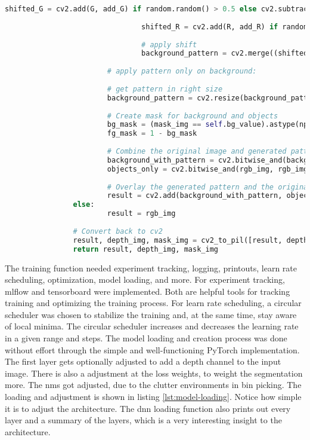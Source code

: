 \begin{lstlisting}[language=Python,caption=Random Augmentation of the Background using cv2 in Python, label=lst:bg-augmentation]
								shifted_G = cv2.add(G, add_G) if random.random() > 0.5 else cv2.subtract(G, add_G)
								
								shifted_R = cv2.add(R, add_R) if random.random() > 0.5 else cv2.subtract(R, add_R)
								
								# apply shift
								background_pattern = cv2.merge((shifted_B, shifted_G, shifted_R))
								
						# apply pattern only on background:
						
						# get pattern in right size
						background_pattern = cv2.resize(background_pattern, (rgb_img.shape[1], rgb_img.shape[0]))
						
						# Create mask for background and objects
						bg_mask = (mask_img == self.bg_value).astype(np.uint8)
						fg_mask = 1 - bg_mask
						
						# Combine the original image and generated pattern
						background_with_pattern = cv2.bitwise_and(background_pattern, background_pattern, mask=bg_mask)
						objects_only = cv2.bitwise_and(rgb_img, rgb_img, mask=fg_mask)
						
						# Overlay the generated pattern and the original objects
						result = cv2.add(background_with_pattern, objects_only)
				else:
						result = rgb_img
				
				# Convert back to cv2
				result, depth_img, mask_img = cv2_to_pil([result, depth_img, mask_img])
				return result, depth_img, mask_img
		\end{lstlisting}
		
		The training function needed experiment tracking, logging, printouts, learn rate scheduling, optimization, model loading, and more. For experiment tracking, mlflow and tensorboard were implemented. Both are helpful tools for tracking training and optimizing the training process. For learn rate scheduling, a circular scheduler was chosen to stabilize the training and, at the same time, stay aware of local minima. The circular scheduler increases and decreases the learning rate in a given range and steps. The model loading and creation process was done without effort through the simple and well-functioning PyTorch implementation. The first layer gets optionally adjusted to add a depth channel to the input image. There is also a adjustment at the loss weights, to weight  the segmentation more. The \acl{nms} got adjusted, due to the clutter environments in bin picking. The loading and adjustment is shown in listing \ref{lst:model-loading}. Notice how simple it is to adjust the architecture. The \ac{dnn} loading function also prints out every layer and a summary of the layers, which is a very interesting insight to the architecture.
		
